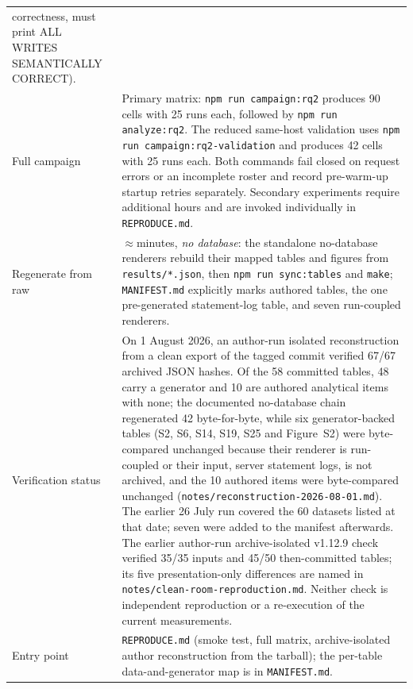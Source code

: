 \documentclass[11pt,a4paper]{article}
\begin{document}
{\begin{longtable}{@{}p{} p{}@{}}
      correctness, must print ALL WRITES SEMANTICALLY CORRECT). \\
    Full campaign & Primary matrix: \texttt{npm run campaign:rq2} produces 90 cells with 25 runs each, followed by \texttt{npm run analyze:rq2}. The reduced same-host validation uses \texttt{npm run campaign:rq2-validation} and produces 42 cells with 25 runs each. Both commands fail closed on request errors or an incomplete roster and record pre-warm-up startup retries separately. Secondary experiments require additional hours and are invoked individually in \texttt{REPRODUCE.md}. \\
    Regenerate from raw & $\approx$minutes, \emph{no database}: the standalone no-database renderers rebuild their mapped tables and figures from \texttt{results/*.json}, then
      \texttt{npm run sync:tables} and \texttt{make}; \texttt{MANIFEST.md} explicitly marks
      authored tables, the one pre-generated statement-log table, and seven run-coupled renderers. \\
    Verification status & On 1 August 2026, an author-run isolated reconstruction from a clean export of the tagged commit verified 67/67 archived JSON hashes. Of the 58 committed tables, 48 carry a generator and 10 are authored analytical items with none; the documented no-database chain regenerated 42 byte-for-byte, while six generator-backed tables (S2, S6, S14, S19, S25 and Figure~S2) were byte-compared unchanged because their renderer is run-coupled or their input, server statement logs, is not archived, and the 10 authored items were byte-compared unchanged (\texttt{notes/reconstruction-2026-08-01.md}). The earlier 26 July run covered the 60 datasets listed at that date; seven were added to the manifest afterwards. The earlier author-run archive-isolated v1.12.9 check verified 35/35 inputs and 45/50 then-committed tables; its five presentation-only differences are named in \texttt{notes/clean-room-reproduction.md}. Neither check is independent reproduction or a re-execution of the current measurements. \\
    Entry point & \texttt{REPRODUCE.md} (smoke test, full matrix, archive-isolated author reconstruction from the tarball); the per-table data-and-generator map is in \texttt{MANIFEST.md}. \\
    \bottomrule
  \end{longtable}
}
\end{document}
